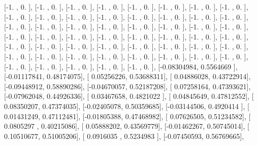 \documentclass{article}
\begin{document}
       [-1.        ,  0.        ],
       [-1.        ,  0.        ],
       [-1.        ,  0.        ],
       [-1.        ,  0.        ],
       [-1.        ,  0.        ],
       [-1.        ,  0.        ],
       [-1.        ,  0.        ],
       [-1.        ,  0.        ],
       [-1.        ,  0.        ],
       [-1.        ,  0.        ],
       [-1.        ,  0.        ],
       [-1.        ,  0.        ],
       [-1.        ,  0.        ],
       [-1.        ,  0.        ],
       [-1.        ,  0.        ],
       [-1.        ,  0.        ],
       [-1.        ,  0.        ],
       [-1.        ,  0.        ],
       [-1.        ,  0.        ],
       [-1.        ,  0.        ],
       [-1.        ,  0.        ],
       [-1.        ,  0.        ],
       [-1.        ,  0.        ],
       [-1.        ,  0.        ],
       [-1.        ,  0.        ],
       [-1.        ,  0.        ],
       [-1.        ,  0.        ],
       [-1.        ,  0.        ],
       [-1.        ,  0.        ],
       [-1.        ,  0.        ],
       [-1.        ,  0.        ],
       [-1.        ,  0.        ],
       [-1.        ,  0.        ],
       [-1.        ,  0.        ],
       [-1.        ,  0.        ],
       [-1.        ,  0.        ],
       [-1.        ,  0.        ],
       [-1.        ,  0.        ],
       [-1.        ,  0.        ],
       [-1.        ,  0.        ],
       [-1.        ,  0.        ],
       [-1.        ,  0.        ],
       [-1.        ,  0.        ],
       [-1.        ,  0.        ],
       [-1.        ,  0.        ],
       [-1.        ,  0.        ],
       [-1.        ,  0.        ],
       [-1.        ,  0.        ],
       [-1.        ,  0.        ],
       [-1.        ,  0.        ],
       [-1.        ,  0.        ],
       [-1.        ,  0.        ],
       [-1.        ,  0.        ],
       [-0.08304984,  0.5564669 ],
       [-0.01117841,  0.48174075],
       [ 0.05256226,  0.53688311],
       [ 0.04886028,  0.43722914],
       [-0.09448912,  0.58890286],
       [-0.04670057,  0.52187208],
       [ 0.07258164,  0.47393621],
       [-0.07962048,  0.44926336],
       [ 0.03467658,  0.4821022 ],
       [ 0.04845649,  0.47812552],
       [ 0.08350207,  0.47374035],
       [-0.02405078,  0.50359685],
       [-0.03144506,  0.4920414 ],
       [ 0.01431249,  0.47112481],
       [-0.01805388,  0.47468982],
       [ 0.07626505,  0.51234582],
       [ 0.0805297 ,  0.40215086],
       [ 0.05888202,  0.43569779],
       [-0.01462267,  0.50745014],
       [ 0.10510677,  0.51005206],
       [ 0.0916035 ,  0.5234983 ],
       [-0.07450593,  0.56769665],
\end{document}
